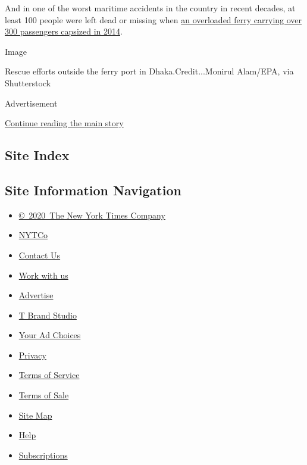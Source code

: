 And in one of the worst maritime accidents in the country in recent
decades, at least 100 people were left dead or missing when
\href{https://www.nytimes.com/2014/08/14/world/asia/bangladeshi-police-capture-owner-of-overloaded-ferry-that-sank.html}{an
overloaded ferry carrying over 300 passengers capsized in 2014}.

Image

Rescue efforts outside the ferry port in Dhaka.Credit...Monirul
Alam/EPA, via Shutterstock

Advertisement

\protect\hyperlink{after-bottom}{Continue reading the main story}

\hypertarget{site-index}{%
\subsection{Site Index}\label{site-index}}

\hypertarget{site-information-navigation}{%
\subsection{Site Information
Navigation}\label{site-information-navigation}}

\begin{itemize}
\tightlist
\item
  \href{https://help.nytimes.com/hc/en-us/articles/115014792127-Copyright-notice}{©~2020~The
  New York Times Company}
\end{itemize}

\begin{itemize}
\tightlist
\item
  \href{https://www.nytco.com/}{NYTCo}
\item
  \href{https://help.nytimes.com/hc/en-us/articles/115015385887-Contact-Us}{Contact
  Us}
\item
  \href{https://www.nytco.com/careers/}{Work with us}
\item
  \href{https://nytmediakit.com/}{Advertise}
\item
  \href{http://www.tbrandstudio.com/}{T Brand Studio}
\item
  \href{https://www.nytimes.com/privacy/cookie-policy\#how-do-i-manage-trackers}{Your
  Ad Choices}
\item
  \href{https://www.nytimes.com/privacy}{Privacy}
\item
  \href{https://help.nytimes.com/hc/en-us/articles/115014893428-Terms-of-service}{Terms
  of Service}
\item
  \href{https://help.nytimes.com/hc/en-us/articles/115014893968-Terms-of-sale}{Terms
  of Sale}
\item
  \href{https://spiderbites.nytimes.com}{Site Map}
\item
  \href{https://help.nytimes.com/hc/en-us}{Help}
\item
  \href{https://www.nytimes.com/subscription?campaignId=37WXW}{Subscriptions}
\end{itemize}
